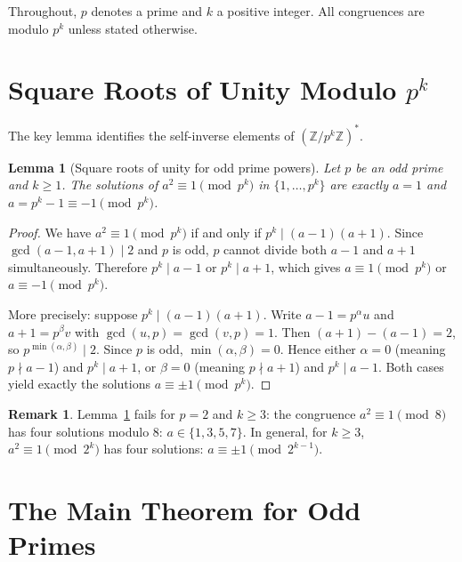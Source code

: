 \documentclass[12pt,a4paper]{amsart}
\newtheorem{lemma}[theorem]{Lemma}
\theoremstyle{definition}
\newtheorem{remark}[theorem]{Remark}
\newcommand{\Z}{\mathbb{Z}}
\begin{document}
Throughout, $p$ denotes a prime and $k$ a positive integer.  All congruences
are modulo $p^k$ unless stated otherwise.

\section{Square Roots of Unity Modulo \texorpdfstring{$p^k$}{p\^{}k}}

The key lemma identifies the self-inverse elements of $(\Z/p^k\Z)^*$.

\begin{lemma}[Square roots of unity for odd prime powers]%
  \label{lem:sqrt_unity}
  Let $p$ be an odd prime and $k \geq 1$.  The solutions of
  $a^2 \equiv 1 \pmod{p^k}$ in $\{1, \ldots, p^k\}$ are exactly
  $a = 1$ and $a = p^k - 1 \equiv -1 \pmod{p^k}$.
\end{lemma}

\begin{proof}
  We have $a^2 \equiv 1 \pmod{p^k}$ if and only if $p^k \mid (a-1)(a+1)$.
  Since $\gcd(a-1, a+1) \mid 2$ and $p$ is odd, $p$ cannot divide both
  $a-1$ and $a+1$ simultaneously.  Therefore $p^k \mid a-1$ or $p^k \mid a+1$,
  which gives $a \equiv 1 \pmod{p^k}$ or $a \equiv -1 \pmod{p^k}$.

  More precisely: suppose $p^k \mid (a-1)(a+1)$.  Write $a - 1 = p^\alpha u$
  and $a + 1 = p^\beta v$ with $\gcd(u,p) = \gcd(v,p) = 1$.
  Then $(a+1) - (a-1) = 2$, so $p^{\min(\alpha,\beta)} \mid 2$.
  Since $p$ is odd, $\min(\alpha, \beta) = 0$.
  Hence either $\alpha = 0$ (meaning $p \nmid a-1$) and $p^k \mid a+1$,
  or $\beta = 0$ (meaning $p \nmid a+1$) and $p^k \mid a-1$.
  Both cases yield exactly the solutions $a \equiv \pm 1 \pmod{p^k}$.
\end{proof}

\begin{remark}
  Lemma~\ref{lem:sqrt_unity} fails for $p = 2$ and $k \geq 3$:
  the congruence $a^2 \equiv 1 \pmod{8}$ has four solutions modulo $8$:
  $a \in \{1, 3, 5, 7\}$.  In general, for $k \geq 3$, $a^2 \equiv 1
  \pmod{2^k}$ has four solutions: $a \equiv \pm 1 \pmod{2^{k-1}}$.
\end{remark}

\section{The Main Theorem for Odd Primes}
\end{document}
